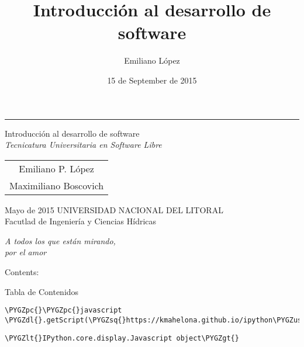 \documentclass[a4paper,12pt,spanish]{sphinxmanual}
\title{Introducción al desarrollo de software}
\date{15 de September de 2015}
\author{Emiliano López}
\newcommand{\sphinxlogo}{}
\def\PYGZus{\char`\_}
\def\PYGZlt{\char`\<}
\def\PYGZgt{\char`\>}
\def\PYGZpc{\char`\%}
\def\PYGZdl{\char`\$}
\def\PYGZsq{\char`\'}
\renewcommand\PYGZsq{\textquotesingle}
\begin{document}

\begin{titlepage}%
    \let\footnotesize\small
    \let\footnoterule\relax
    \rule{\textwidth}{1pt}%
    \begin{flushright}%
      \sphinxlogo%
      \vspace{15 mm}
      {\rm\Huge Introducción al desarrollo de software\\ }
      {\em\large Tecnicatura Universitaria en Software Libre}
      \vfill
      {
        \begin{tabular}[t]{c}
          \large Emiliano P. López \\
          \large Maximiliano Boscovich
        \end{tabular}
        \par}
      \vfill\vfill
      {\large
        Mayo de 2015
       \vfill
       UNIVERSIDAD NACIONAL DEL LITORAL\\
          Facutlad de Ingeniería y Ciencias Hídricas\\
      }%
    \end{flushright}%
  \end{titlepage}%
  \cleardoublepage%
  \label{pre:dedication}
  \vspace*{\fill}
  \begin{flushright}
    \emph{A todos los que están mirando,\\por el amor}
  \end{flushright}
  \vspace{\fill}

\tableofcontents
{}\label{index::doc}


Contents:

Tabla de Contenidos

\begin{Verbatim}[commandchars=\\\{\}]
\PYGZpc{}\PYGZpc{}javascript
\PYGZdl{}.getScript(\PYGZsq{}https://kmahelona.github.io/ipython\PYGZus{}notebook\PYGZus{}goodies/ipython\PYGZus{}notebook\PYGZus{}toc.js\PYGZsq{})
\end{Verbatim}

\begin{Verbatim}[commandchars=\\\{\}]
\PYGZlt{}IPython.core.display.Javascript object\PYGZgt{}
\end{Verbatim}
\end{document}
